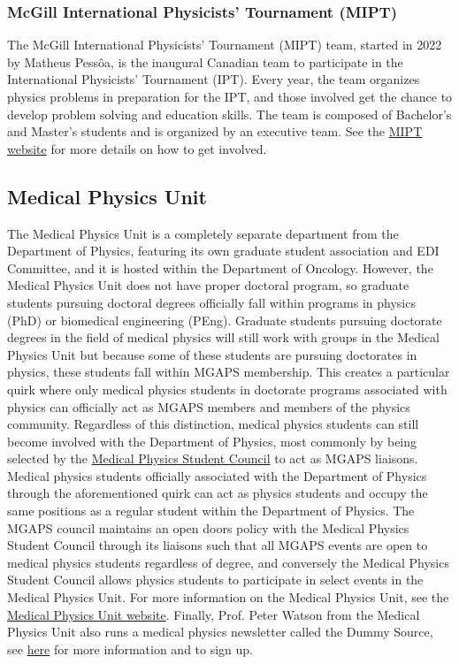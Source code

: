 \subsubsection{McGill International Physicists’ Tournament (MIPT)}
The McGill International Physicists’ Tournament (MIPT) team, started in 2022 by Matheus Pessôa, is the inaugural Canadian team to participate in the International Physicists' Tournament (IPT). Every year, the team organizes physics problems in preparation for the IPT, and those involved get the chance to develop problem solving and education skills. The team is composed of Bachelor's and Master's students and is organized by an executive team. See the \href{https://mipt.sus.mcgill.ca/}{MIPT website} for more details on how to get involved.


\subsection{Medical Physics Unit} 
The Medical Physics Unit is a completely separate department from the Department of Physics, featuring its own graduate student association and EDI Committee, and it is hosted within the Department of Oncology. However, the Medical Physics Unit does not have proper doctoral program, so graduate students pursuing doctoral degrees officially fall within programs in physics (PhD) or biomedical engineering (PEng). Graduate students pursuing doctorate degrees in the field of medical physics will still work with groups in the Medical Physics Unit but because some of these students are pursuing doctorates in physics, these students fall within MGAPS membership. This creates a particular quirk where only medical physics students in doctorate programs associated with physics can officially act as MGAPS members and members of the physics community. Regardless of this distinction, medical physics students can still become involved with the Department of Physics, most commonly by being selected by the \href{https://www.mcgill.ca/medphys/students/student-council}{Medical Physics Student Council} to act as MGAPS liaisons. Medical physics students officially associated with the Department of Physics through the aforementioned quirk can act as physics students and occupy the same positions as a regular student within the Department of Physics. The MGAPS council maintains an open doors policy with the Medical Physics Student Council through its liaisons such that all MGAPS events are open to medical physics students regardless of degree, and conversely the Medical Physics Student Council allows physics students to participate in select events in the Medical Physics Unit. For more information on the Medical Physics Unit, see the \href{https://www.mcgill.ca/medphys/}{Medical Physics Unit website}. Finally, Prof. Peter Watson from the Medical Physics Unit also runs a medical physics newsletter called the Dummy Source, see \href{https://thedummysource.github.io/}{here} for more information and to sign up.

